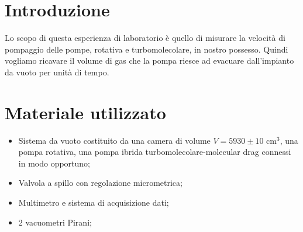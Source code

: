 \section{Introduzione}

Lo scopo di questa esperienza di laboratorio è quello di misurare la velocità di pompaggio delle pompe, rotativa e turbomolecolare, in nostro possesso. Quindi vogliamo ricavare il volume di gas che la pompa riesce ad evacuare dall'impianto da vuoto per unità di tempo.

\section{Materiale utilizzato}

\begin{itemize}
	\item{Sistema da vuoto costituito da una camera di volume $V = 5930 \pm 10$ \si{\centi\metre}$^3$, una pompa rotativa, una pompa ibrida turbomolecolare-molecular drag connessi in modo opportuno;}
	\item{Valvola a spillo con regolazione micrometrica;}
	\item{Multimetro e sistema di acquisizione dati;}
	\item{2 vacuometri Pirani;}
\end{itemize}
